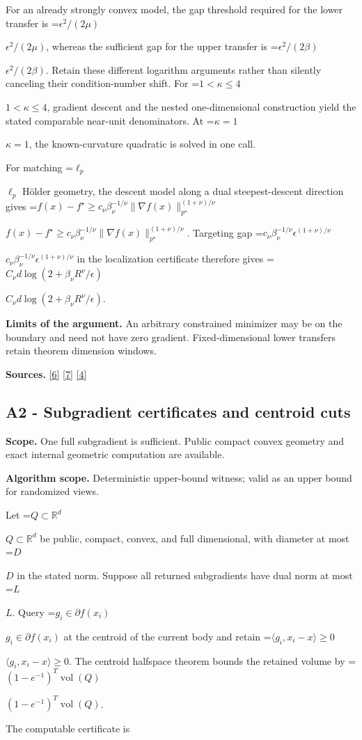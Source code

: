 \documentclass[10pt,a4paper]{article}
\newcommand{\AtlasMath}[1]{\par\begingroup\centering\setbox0=\hbox{$\displaystyle #1$}\ifdim\wd0>1.4\linewidth\typeout{ATLAS WIDE FORMULA: \the\wd0}\fi\ifdim\wd0>\linewidth\resizebox{\linewidth}{!}{\box0}\else\box0\fi\par\endgroup}
\newcommand{\AtlasInlineMath}[1]{\begingroup\setbox0=\hbox{$#1$}\ifdim\wd0>.4\linewidth\endgroup\AtlasMath{#1}\else\endgroup$#1$\fi}
\begin{document}
For an already strongly convex model, the gap threshold required for the lower transfer is \AtlasInlineMath{\epsilon^2/(2\mu)}, whereas the sufficient gap for the upper transfer is \AtlasInlineMath{\epsilon^2/(2\beta)}. Retain these different logarithm arguments rather than silently canceling their condition-number shift. For \AtlasInlineMath{1<\kappa\le4}, gradient descent and the nested one-dimensional construction yield the stated comparable near-unit denominators. At \AtlasInlineMath{\kappa=1}, the known-curvature quadratic is solved in one call.

For matching \AtlasInlineMath{\ell_p} Hölder geometry, the descent model along a dual steepest-descent direction gives
\AtlasInlineMath{f(x)-f^\star\ge c_\nu\beta_\nu^{-1/\nu}\|\nabla f(x)\|_{p^\star}^{(1+\nu)/\nu}}.
Targeting gap \AtlasInlineMath{c_\nu\beta_\nu^{-1/\nu}\epsilon^{(1+\nu)/\nu}} in the localization certificate therefore gives
\AtlasInlineMath{C_\nu d\log(2+\beta_\nu R^\nu/\epsilon)}.

\textbf{Limits of the argument.} An arbitrary constrained minimizer may be on the boundary and need not have zero gradient. Fixed-dimensional lower transfers retain theorem dimension windows.

\textbf{Sources.} \href{https://arxiv.org/pdf/2101.09740v2}{[6]} \href{https://arxiv.org/pdf/2609.33360v2}{[7]} \href{https://arxiv.org/pdf/2609.10874}{[4]}

\subsection{A2 - Subgradient certificates and centroid cuts}
\textbf{Scope.} One full subgradient is sufficient. Public compact convex geometry and exact internal geometric computation are available.

\textbf{Algorithm scope.} Deterministic upper-bound witness; valid as an upper bound for randomized views.

Let \AtlasInlineMath{Q\subset\mathbb R^d} be public, compact, convex, and full dimensional, with diameter at most \AtlasInlineMath{D} in the stated norm. Suppose all returned subgradients have dual norm at most \AtlasInlineMath{L}. Query \AtlasInlineMath{g_i\in\partial f(x_i)} at the centroid of the current body and retain \AtlasInlineMath{\langle g_i,x_i-x\rangle\ge0}. The centroid halfspace theorem bounds the retained volume by \AtlasInlineMath{(1-e^{-1})^T\operatorname{vol}(Q)}.

The computable certificate is
\end{document}

